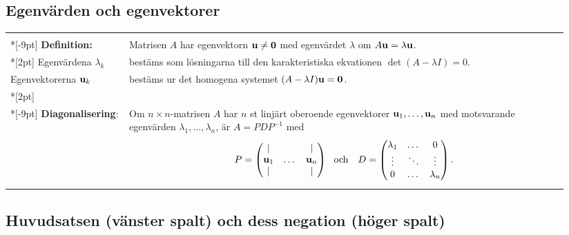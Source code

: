 \documentclass{article}
\begin{document}
\subsection*{Egenvärden och egenvektorer}%
\label{subsection*}
\begin{tabular}{|p{0.2\linewidth}|p{0.745\linewidth}|}
  \hline & \\*[-9pt]
  \textbf{Definition:}
  &
  Matrisen $A$ har egenvektorn ${\mathbf u}\neq\mathbf 0$ med
  egenvärdet $\lambda$ om
  $A{\mathbf u}=\lambda{\mathbf u}$.
  \\*[2pt] %
  Egenvärdena $\lambda_k$ 
   & bestäms som lösningarna till den karakteristiska ekvationen 
   $\det(A-\lambda I)=0$.\\
  Egenvektorerna ${\mathbf u}_k$& bestäms ur det homogena systemet $(A-\lambda I){\mathbf u}=\mathbf{0}$.
  \\*[2pt] \hline & \\*[-9pt]
  \textbf{Diagonalisering}:
&
Om $n\times n$-matrisen $A$ har $n$ st linjärt oberoende
egenvektorer ${\mathbf u}_1,\dots,{\mathbf u}_n$ med motsvarande egenvärden
$\lambda_1,\dots,\lambda_n$, är $A=PDP^{-1}$ med
\vspace{-10pt}
  $$ P=
  \begin{pmatrix}
    |&&|\\
    {\mathbf u}_1&\dots&{\mathbf u}_n\\
    |&&|
  \end{pmatrix}
  \mbox{ \ och \ \ }
  D = \begin{pmatrix}
    \lambda_1&\dots&0\\
    \vdots&\ddots&\vdots\\
    0&\dots&\lambda_n
  \end{pmatrix}.
  $$
  \vspace{-12pt}
  \\
  \hline
\end{tabular}%

\subsection*{Huvudsatsen (vänster spalt) och dess negation (höger spalt)}%
\end{document}
